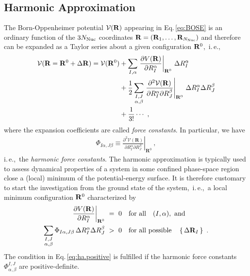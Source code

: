 \subsection{Harmonic Approximation}
The Born-Oppenheimer potential $\mathcal V ({\bf R})$ appearing in Eq.\,\eqref{eq:BOSE} is an ordinary function of the $3 N_{\rm Nuc}$ coordinates ${\bf R} = ({\bf R}_1, \ldots, {\bf R}_{N_{\rm Nuc}})$ and therefore can be expanded as a Taylor series about a given configuration ${\bf R}^0$,~i.\,e.,
\begin{align}
\begin{split}
  \mathcal V ({\bf R} = {\bf R}^0 + \Delta {\bf R})
    = \mathcal V ({\bf R}^0)
    &+ \sum_{I, \alpha} 
      \left. \frac{\partial V({\bf R})}{\partial R^\alpha_I} 
      \right\vert_{{\bf R}^0}
    \,\Delta R^\alpha_I
    \\
    &
    + \frac{1}{2}
    \sum_{\substack{I, J \\ \alpha, \beta}}
    \left.\frac{\partial^{2} \mathcal{V}(\mathbf{R})}{\partial R_{I}^{\alpha} \partial R_{J}^{\beta}}\right|_{\mathbf{R}^{0}}
    \, \Delta R_I^\alpha \Delta R_J^\beta
    \\
    &+\frac{1}{3!}\cdots ~,
\end{split}
\end{align}
where the expansion coefficients are called \emph{force constants}. In particular, we have
\begin{align}
  \Phi_{I \alpha, J \beta}
  \equiv \left.\frac{\partial^{2} \mathcal{V}(\mathbf{R})}{\partial R_{I}^{\alpha} \partial R_{J}^{\beta}}\right|_{\mathbf{R}^{0}}~,
  \label{eq:FC2}
\end{align}
i.\,e.,~the \emph{harmonic force constants}. The harmonic approximation is typically used to assess dynamical properties of a system in some confined phase-space region close a (local) minimum of the potential-energy surface. It is therefore customary to start the investigation from the ground state of the system,~i.\,e.,~a local minimum configuration ${\bf R}^0$ characterized by
\begin{align}
	\left. \frac{\partial V({\bf R})}{\partial R^\alpha_I} 
	\right\vert_{{\bf R}^0} 
		&~=~ 0 \quad\text{for all}\quad (I, \alpha),~\text{and} \\
	\sum_{\substack{I, J \\ \alpha, \beta}}
	\Phi_{I \alpha, J \beta}
	\, \Delta R_I^\alpha \Delta R_J^\beta
		&~>~ 0 \quad\text{for all possible}\quad \set{\Delta {\bf R}_I}~.
	\label{eq:ha.positive}
\end{align}
The condition in Eq.\,\eqref{eq:ha.positive} is fulfilled if the harmonic force constants $\Phi_{\alpha, \beta}^{I, J}$ are positive-definite.

